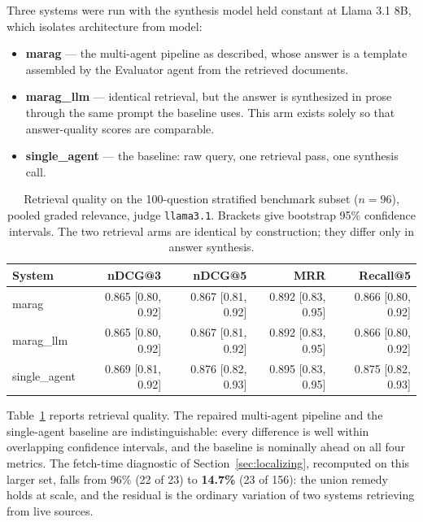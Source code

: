 Three systems were run with the synthesis model held constant at Llama 3.1 8B,
which isolates architecture from model:

\begin{itemize}
  \item \textbf{marag} --- the multi-agent pipeline as described, whose answer is
  a template assembled by the Evaluator agent from the retrieved documents.
  \item \textbf{marag\_llm} --- identical retrieval, but the answer is
  synthesized in prose through the same prompt the baseline uses. This arm
  exists solely so that answer-quality scores are comparable.
  \item \textbf{single\_agent} --- the baseline: raw query, one retrieval pass,
  one synthesis call.
\end{itemize}

\begin{table}[t]
\caption{Retrieval quality on the 100-question stratified benchmark subset
($n=96$), pooled graded relevance, judge \texttt{llama3.1}. Brackets give
bootstrap 95\% confidence intervals. The two retrieval arms are identical by
construction; they differ only in answer synthesis.}
\label{tab:scaled-retrieval}
\begin{tabular}{lrrrr}
\toprule
System & nDCG@3 & nDCG@5 & MRR & Recall@5 \\
\midrule
marag         & 0.865 [0.80, 0.92] & 0.867 [0.81, 0.92] & 0.892 [0.83, 0.95] & 0.866 [0.80, 0.92] \\
marag\_llm    & 0.865 [0.80, 0.92] & 0.867 [0.81, 0.92] & 0.892 [0.83, 0.95] & 0.866 [0.80, 0.92] \\
single\_agent & 0.869 [0.81, 0.92] & 0.876 [0.82, 0.93] & 0.895 [0.83, 0.95] & 0.875 [0.82, 0.93] \\
\bottomrule
\end{tabular}
\end{table}

Table~\ref{tab:scaled-retrieval} reports retrieval quality. The repaired
multi-agent pipeline and the single-agent baseline are indistinguishable: every
difference is well within overlapping confidence intervals, and the baseline is
nominally ahead on all four metrics. The fetch-time diagnostic of
Section~\ref{sec:localizing}, recomputed on this larger set, falls from 96\% (22
of 23) to \textbf{14.7\%} (23 of 156): the union remedy holds at scale, and the
residual is the ordinary variation of two systems retrieving from live sources.


